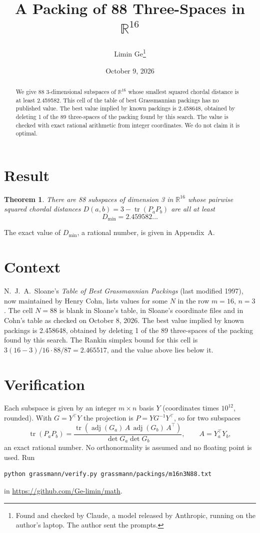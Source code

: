 \documentclass[11pt,a4paper]{article}
\title{A Packing of 88 Three-Spaces in $\mathbb{R}^{16}$}
\author{Limin Ge\thanks{Found and checked by Claude, a model released by Anthropic, running on the author's laptop. The author sent the prompts.}}
\date{October 9, 2026}
\newtheorem*{theorem}{Theorem}
\begin{document}
\maketitle
\begin{abstract}
We give 88 3-dimensional subspaces of $\mathbb{R}^{16}$ whose smallest squared chordal distance is at least 2.459582. This cell of the table of best Grassmannian packings has no published value. The best value implied by known packings is 2.458648, obtained by deleting 1 of the 89 three-spaces of the packing found by this search. The value is checked with exact rational arithmetic from integer coordinates. We do not claim it is optimal.
\end{abstract}

\section{Result}
\begin{theorem}
There are 88 subspaces of dimension 3 in $\mathbb{R}^{16}$ whose pairwise squared chordal distances $D(a,b) = 3 - \operatorname{tr}(P_aP_b)$ are all at least
\[ D_{\min} = 2.459582\ldots \]
\end{theorem}
The exact value of $D_{\min}$, a rational number, is given in Appendix~A.


\section{Context}
N.~J.~A.~Sloane's \emph{Table of Best Grassmannian Packings} (last modified 1997), now maintained by Henry Cohn, lists values for some $N$ in the row $m=16$, $n=3$. The cell $N=88$ is blank in Sloane's table, in Sloane's coordinate files and in Cohn's table as checked on October 8, 2026. The best value implied by known packings is 2.458648, obtained by deleting 1 of the 89 three-spaces of the packing found by this search. The Rankin simplex bound for this cell is $3(16-3)/16\cdot 88/87 = 2.465517$, and the value above lies below it.


\section{Verification}
Each subspace is given by an integer $m\times n$ basis $Y$ (coordinates times $10^{12}$, rounded). With $G=Y^\top Y$ the projection is $P=YG^{-1}Y^\top$, so for two subspaces
\[ \operatorname{tr}(P_aP_b)=\frac{\operatorname{tr}(\operatorname{adj}(G_a)\,A\,\operatorname{adj}(G_b)\,A^\top)}{\det G_a\det G_b},\qquad A=Y_a^\top Y_b, \]
an exact rational number. No orthonormality is assumed and no floating point is used. Run
\begin{verbatim}
python grassmann/verify.py grassmann/packings/m16n3N88.txt
\end{verbatim}
in \url{https://github.com/Ge-limin/math}.
\end{document}
